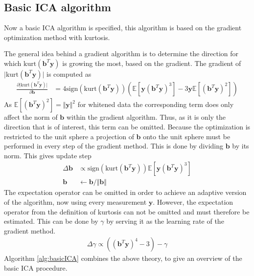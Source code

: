 \subsection{Basic ICA algorithm}\label{sec:gra_kur}
Now a basic ICA algorithm is specified, this algorithm is based on the gradient optimization method with kurtosis.

The general idea behind a gradient algorithm is to determine the direction for which $\text{kurt}(\mathbf{b}^T \mathbf{y})$ is growing the most, based on the gradient. 
The gradient of $\vert \text{kurt}(\mathbf{b}^T \mathbf{y}) \vert$ is computed as
\begin{align}\label{eq:kurt}
\frac{\partial \vert \text{kurt}(\textbf{b}^T \textbf{y})\vert}{\partial \mathbf{b}} &= 4 \text{sign}(\text{kurt}(\textbf{b}^T \textbf{y})) (\mathbb{E}[\mathbf{y} (\textbf{b}^T \textbf{y})^3] - 3 \mathbf{y} \mathbb{E}[(\textbf{b}^T \textbf{y})^2]) 
\end{align} 
As $\mathbb{E}[(\mathbf{b}^T \mathbf{y})^2] = \Vert \mathbf{y} \Vert^2$ for whitened data the corresponding term does only affect the norm of $\mathbf{b}$ within the gradient algorithm. 
Thus, as it is only the direction that is of interest, this term can be omitted. 
Because the optimization is restricted to the unit sphere a projection of $\mathbf{b}$ onto the unit sphere must be performed in every step of the gradient method. 
This is done by dividing $\mathbf{b}$ by its norm. 
This gives update step \cite[p. 178]{ICA}
\begin{align*}
\Delta \textbf{b} &\propto \text{sign}\left( \text{kurt}(\textbf{b}^T \textbf{y}) \right) \mathbb{E}[\textbf{y}(\textbf{b}^T \textbf{y})^3] \\
\textbf{b} &\leftarrow \textbf{b}/\Vert \textbf{b} \Vert
\end{align*}  
The expectation operator can be omitted in order to achieve an adaptive version of the algorithm, now using every measurement $\mathbf{y}$. 
However, the expectation operator from the definition of kurtosis can not be omitted and must therefore be estimated. 
This can be done by $\gamma$ by serving it as the learning rate of the gradient method.
\begin{align*}
\Delta \gamma \propto((\textbf{b}^T \textbf{y})^4 - 3) - \gamma
\end{align*}
Algorithm \ref{alg:basicICA} combines the above theory, to give an overview of the basic ICA procedure. 
